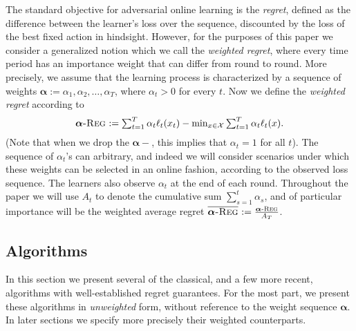 \documentclass[final,12pt]{colt2018} %
\def\balpha{\boldsymbol{\alpha}}
\newcommand{\regret}[1]{\balpha\textsc{-Reg}^{#1}}
\newcommand{\avgregret}[1]{\overline{\balpha\textsc{-Reg}}^{#1}}
\newcommand{\XX}{\mathcal{X}}
\begin{document}
The standard objective for adversarial online learning is the \emph{regret}, defined as the difference between the learner's loss over the sequence, discounted by the loss of the best fixed action in hindsight. However, for the purposes of this paper we consider a generalized notion which we call the \emph{weighted regret}, where every time period has an importance weight that can differ from round to round. More precisely, we assume that the learning process is characterized by a sequence of weights $\balpha := \alpha_1, \alpha_2, \ldots, \alpha_T$, where $\alpha_t > 0$ for every $t$. Now we define the \emph{weighted regret} according to
\[
\textstyle  \regret{} := \sum_{t=1}^T  \alpha_t  \ell_t(x_t) - \min_{x \in \XX} \sum_{t=1}^T  \alpha_t  \ell_t(x).
\]
(Note that when we drop the $\balpha-$, this implies that $\alpha_t = 1$ for all $t$). The sequence of $\alpha_t$'s can arbitrary, and indeed we will consider scenarios under which these weights can be selected in an online fashion, according to the observed loss sequence. The learners also observe $\alpha_t$ at the end of each round. Throughout the paper we will use $A_t$ to denote the cumulative sum $\sum_{s=1}^t \alpha_s$, and of particular importance will be the weighted average regret $\avgregret{} := \frac{\regret{}}{A_T}$.

\subsection{Algorithms}
In this section we present several of the classical, and a few more recent, algorithms with well-established regret guarantees. For the most part, we present these algorithms in \emph{unweighted} form, without reference to the weight sequence $\balpha$. In later sections we specify more precisely their weighted counterparts.
\end{document}
